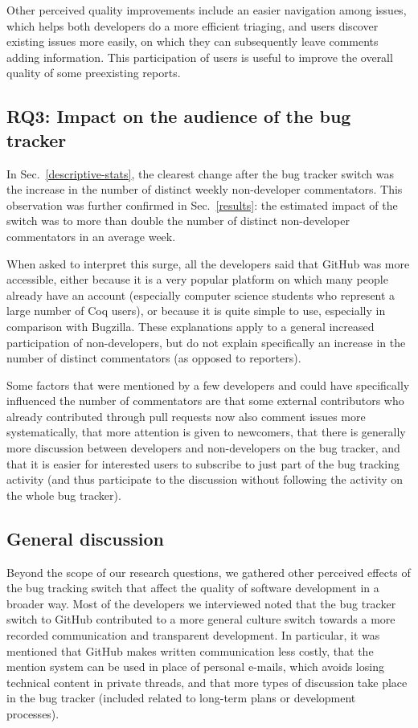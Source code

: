 \documentclass[conference]{IEEEtran}
\begin{document}
Other perceived quality improvements include an easier navigation among issues, which helps both developers do a more efficient triaging, and users discover existing issues more easily, on which they can subsequently leave comments adding information. This participation of users is useful to improve the overall quality of some preexisting reports.

\subsection{RQ3: Impact on the audience of the bug tracker}

In Sec.~\ref{descriptive-stats}, the clearest change after the bug tracker switch was the increase in the number of distinct weekly non-developer commentators. This observation was further confirmed in Sec.~\ref{results}: the estimated impact of the switch was to more than double the number of distinct non-developer commentators in an average week.

When asked to interpret
this surge,
all the developers said that GitHub was more accessible, either because it is a very popular platform on which many people already have an account (especially computer science students who represent a large number of Coq users), or because it is quite simple to use, especially in comparison with Bugzilla. These explanations apply to a general increased participation of non-developers, but do not explain specifically an increase in the number of distinct commentators (as opposed to reporters).

Some factors that were mentioned by a few developers and could have specifically influenced the number of commentators are that some external contributors who already contributed through pull requests now also comment issues more systematically, that more attention is given to newcomers, that there is generally more discussion between developers and non-developers on the bug tracker, and that it is easier for interested users to subscribe to just part of the bug tracking activity (and thus participate to the discussion without following the activity on the whole bug tracker).

\subsection{General discussion}

Beyond the scope of our research questions, we gathered other perceived effects of the bug tracking switch that affect the quality of software development in a broader way. Most of the developers we interviewed noted that the bug tracker switch to GitHub contributed to a more general culture switch towards a more recorded communication and transparent development. In particular, it was mentioned that GitHub makes written communication less costly, that the mention system can be used in place of personal e-mails, which avoids losing technical content in private threads, and that more types of discussion take place in the bug tracker (included related to long-term plans or development processes).
\end{document}
